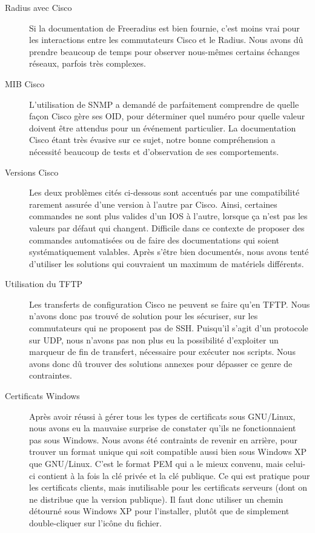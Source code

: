 \begin{description}
\item[Radius avec Cisco] Si la documentation de Freeradius est bien fournie, c'est moins vrai pour les interactions entre les commutateurs Cisco et le Radius. Nous avons dû prendre beaucoup de temps pour observer nous-mêmes certains échanges réseaux, parfois très complexes.
\item[MIB Cisco] L'utilisation de SNMP a demandé de parfaitement comprendre de quelle façon Cisco gère ses OID, pour déterminer quel numéro pour quelle valeur doivent être attendus pour un événement particulier. La documentation Cisco étant très évasive sur ce sujet, notre bonne compréhension a nécessité beaucoup de tests et d'observation de ses comportements.
\item[Versions Cisco] Les deux problèmes cités ci-dessous sont accentués par une compatibilité rarement assurée d'une version à l'autre par Cisco. Ainsi, certaines commandes ne sont plus valides d'un IOS à l'autre, lorsque ça n'est pas les valeurs par défaut qui changent. Difficile dans ce contexte de proposer des commandes automatisées ou de faire des documentations qui soient systématiquement valables. Après s'être bien documentés, nous avons tenté d'utiliser les solutions qui couvraient un maximum de matériels différents.
\item[Utilisation du TFTP] Les transferts de configuration Cisco ne peuvent se faire qu'en TFTP. Nous n'avons donc pas trouvé de solution pour les sécuriser, sur les commutateurs qui ne proposent pas de SSH. Puisqu'il s'agit d'un protocole sur UDP, nous n'avons pas non plus eu la possibilité d'exploiter un marqueur de fin de transfert, nécessaire pour exécuter nos scripts. Nous avons donc dû trouver des solutions annexes pour dépasser ce genre de contraintes.
\item[Certificats Windows] Après avoir réussi à gérer tous les types de certificats sous GNU/Linux, nous avons eu la mauvaise surprise de constater qu'ils ne fonctionnaient pas sous Windows. Nous avons été contraints de revenir en arrière, pour trouver un format unique qui soit compatible aussi bien sous Windows XP que GNU/Linux. C'est le format PEM qui a le mieux convenu, mais celui-ci contient à la fois la clé privée et la clé publique. Ce qui est pratique pour les certificats clients, mais inutilisable pour les certificats serveurs (dont on ne distribue que la version publique). Il faut donc utiliser un chemin détourné sous Windows XP pour l'installer, plutôt que de simplement double-cliquer sur l'icône du fichier.

\end{description}
